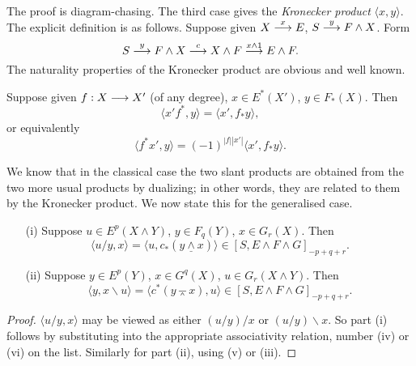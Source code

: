 \documentclass[../main]{subfiles}
\begin{document}
The proof is diagram-chasing. The third case gives the \emph{Kronecker product} $\langle x, y\rangle$. The explicit definition is as follows. Suppose given $X \overset{x}{\longrightarrow} E$, $S \overset{y}{\longrightarrow} F \wedge X$. Form $$S \overset{y}{\longrightarrow} F \wedge X \overset{c}{\longrightarrow} X \wedge F \overset{x \wedge 1}{\longrightarrow} E \wedge F.$$ The naturality properties of the Kronecker product are obvious and well known. 

\begin{proposition}\label{prop:p3ch09.6}
Suppose given $f : X \overset{}{\longrightarrow} X'$ (of any degree), $x \in E^\ast(X')$, $y \in F_\ast(X)$. Then $$\langle x'f^\ast, y\rangle = \langle x', f_\ast y\rangle,$$ or equivalently $$\langle f^\ast x', y\rangle = (-1)^{|f| |x'|} \langle x', f_\ast y\rangle.$$ 
\end{proposition}

We know that in the classical case the two slant products are obtained from the two more usual products by dualizing; in other words, they are related to them by the Kronecker product. We now state this for the generalised case.

\begin{proposition}\label{prop:p3ch09.7}
\begin{enumerate}
    \item[(i)] Suppose $u \in E^p(X \wedge Y)$, $y \in F_q(Y)$, $x \in G_r(X)$. Then $$\langle u/y, x\rangle = \langle u, c_\ast(y \underline \wedge x)\rangle \in [S, E \wedge F \wedge G]_{-p + q + r}.$$
    \item[(ii)] Suppose $y \in E^p(Y)$, $x \in G^q(X)$, $u \in G_r(X \wedge Y)$. Then $$\langle y, x \backslash u\rangle = \langle c^\ast(y \barwedge x), u\rangle \in [S, E \wedge F \wedge G]_{-p + q + r}.$$
\end{enumerate}
\end{proposition}

\begin{proof}
$\langle u/y, x\rangle$ may be viewed as either $(u/y)/x$ or $(u/y) \backslash x$. So part (i) follows by substituting into the appropriate associativity relation, number (iv) or (vi) on the list. Similarly for part (ii), using (v) or (iii). 
\end{proof}
\end{document}
